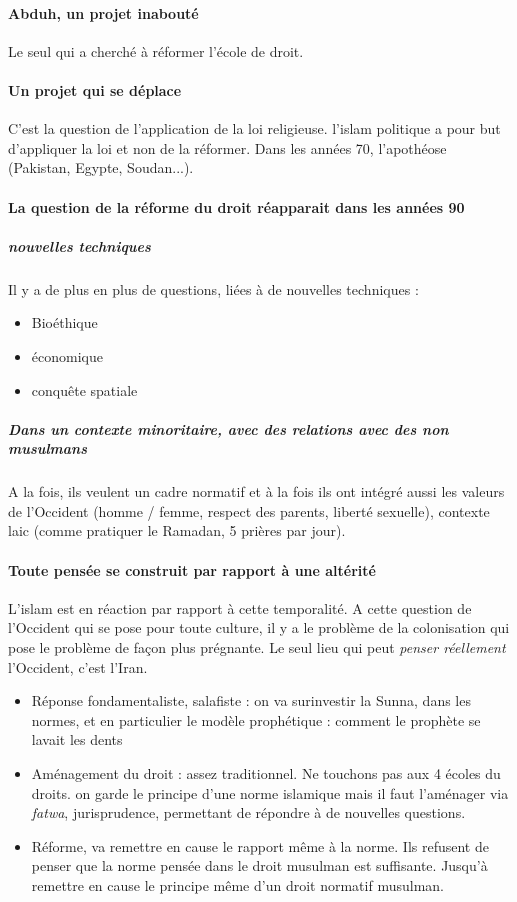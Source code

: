 \paragraph{Abduh, un projet inabouté} Le seul qui a cherché à réformer l'école de droit.

\paragraph{Un projet qui se déplace} C'est la question de l'application de la loi religieuse. l'islam politique a pour but d'appliquer la loi et non de la réformer. Dans les années 70, l'apothéose (Pakistan, Egypte, Soudan...). 

\paragraph{La question de la réforme du droit réapparait dans les années 90} 
\subparagraph{nouvelles techniques} Il y a de plus en plus de questions, liées à de nouvelles techniques : 
\begin{itemize}
    \item Bioéthique
    \item économique
    \item conquête spatiale
\end{itemize}

 \subparagraph{Dans un contexte minoritaire, avec des relations avec des non musulmans} A la fois, ils veulent un cadre normatif et à la fois ils ont intégré aussi les valeurs de l'Occident (homme / femme, respect des parents, liberté sexuelle), contexte laic (comme pratiquer le Ramadan, 5 prières par jour). 
 
 \paragraph{Toute pensée se construit par rapport à une altérité} L'islam est en réaction par rapport à cette temporalité. A cette question de l'Occident qui se pose pour toute culture, il y a le problème de la colonisation qui pose le problème de façon plus prégnante. Le seul lieu qui peut \textit{penser réellement} l'Occident, c'est l'Iran.
 
 
 
 
 \begin{itemize}
     \item Réponse fondamentaliste, salafiste : on va surinvestir la Sunna, dans les normes, et en particulier le modèle prophétique : comment le prophète se lavait les dents
     \item Aménagement du droit : assez traditionnel. Ne touchons pas aux 4 écoles du droits. on garde le principe d'une norme islamique mais il faut l'aménager via \textit{fatwa}, jurisprudence, permettant de répondre à de nouvelles questions.
     \item Réforme, va remettre en cause le rapport même à la norme. Ils refusent de penser que la norme pensée dans le droit musulman est suffisante. Jusqu'à remettre en cause le principe même d'un droit normatif musulman.
 \end{itemize}
 
